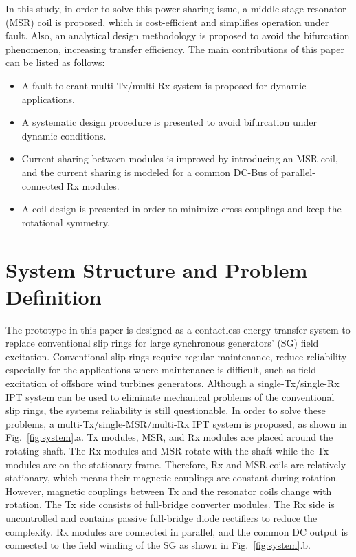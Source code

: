 \documentclass[journal]{IEEEtran}
\begin{document}
In this study, in order to solve this power-sharing issue, a middle-stage-resonator (MSR) coil is proposed, which is cost-efficient and simplifies operation under fault. 
Also, an analytical design methodology is proposed to avoid the bifurcation phenomenon, increasing transfer efficiency.
The main contributions of this paper can be listed as follows:
\vspace*{-1mm}
\begin{itemize}
    \item A fault-tolerant multi-Tx/multi-Rx system is proposed for dynamic applications.
    \item A systematic design procedure is presented to avoid bifurcation under dynamic conditions.
    \item Current sharing between modules is improved by introducing an MSR coil, and the current sharing is modeled for a common DC-Bus of parallel-connected Rx modules.
    \item A coil design is presented in order to minimize cross-couplings and keep the rotational symmetry.
\end{itemize}

\section{System Structure and Problem Definition}
The prototype in this paper is designed as a contactless energy transfer system to replace conventional slip rings for large synchronous generators' (SG) field excitation. 
Conventional slip rings require regular maintenance, reduce reliability
especially for the applications where maintenance is difficult, such as field excitation of offshore wind turbines generators. Although a single-Tx/single-Rx IPT system can be used to eliminate mechanical problems of the conventional slip rings, the systems reliability is still questionable.
In order to solve these problems, a multi-Tx/single-MSR/multi-Rx IPT system is proposed, as shown in  Fig.~\ref{fig:system}.a.
Tx modules, MSR, and Rx modules are placed around the rotating shaft. 
The Rx modules and MSR rotate with the shaft while the Tx modules are on the stationary frame. 
Therefore, Rx and MSR coils are relatively stationary, which means their magnetic couplings are constant during rotation. 
However, magnetic couplings between Tx and the resonator coils change with rotation. 
The Tx side consists of full-bridge converter modules. 
The Rx side is uncontrolled and contains passive full-bridge diode rectifiers to reduce the complexity.
Rx modules are connected in parallel, and the common DC output is connected to the field winding of the SG as shown in Fig.~\ref{fig:system}.b.
\end{document}
